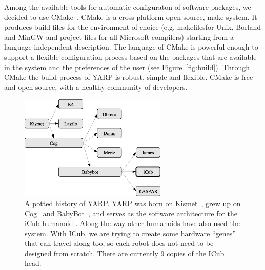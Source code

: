 Among the available tools for automatic configuraton of 
software packages, we decided to use CMake~\cite{cmake}. 
CMake is a cross-platform open-source, make system. It 
produces build files for the environment of choice (e.g. 
makefilesfor Unix, Borland and MinGW and project files for 
all Microsoft compilers) starting from a language independent 
description. The language of CMake is powerful enough
to support a flexible configuration process based 
on the packages that are available in the system and 
the preferences of the user (see Figure~\ref{fig:build}). Through 
CMake the build process of YARP is robust, simple and 
flexible.
%
%
%
CMake is free and open-source, with a healthy community of 
developers.





\begin{figure}[t]
\begin{center}
\includegraphics[height=5cm]{fig-family}
\caption{
%
\label{fig:family}
%
A potted history of YARP.  YARP was born on Kismet~\cite{breazeal01active},
grew up on Cog~\cite{brooks99cog} and 
BabyBot~\cite{natale05linking}, and serves as the
software architecture for the iCub humanoid \cite{tsagarakis2007icub}.
%
Along the way other humanoids have also used the system.
%
With ICub, we are trying to create some hardware ``genes''
that can travel along too, so each robot does not need to
be designed from scratch.
%
There are currently 9 copies of the ICub head.
%
%
}
\end{center}
\end{figure}



